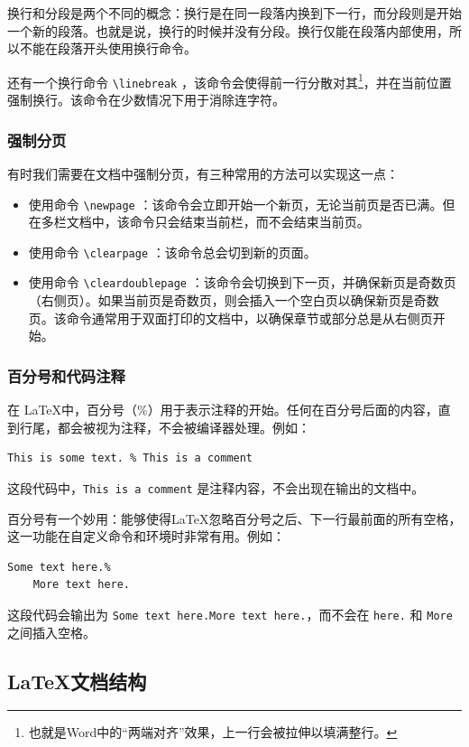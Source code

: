 换行和分段是两个不同的概念：换行是在同一段落内换到下一行，而分段则是开始一个新的段落。也就是说，换行的时候并没有分段。换行仅能在段落内部使用，所以不能在段落开头使用换行命令。

还有一个换行命令 \verb|\linebreak| ，该命令会使得前一行分散对其\footnote{也就是Word中的“两端对齐”效果，上一行会被拉伸以填满整行。}，并在当前位置强制换行。该命令在少数情况下用于消除连字符。

\subsubsection{强制分页}

有时我们需要在文档中强制分页，有三种常用的方法可以实现这一点：
\begin{itemize}
  \item 使用命令 \verb|\newpage| ：该命令会立即开始一个新页，无论当前页是否已满。但在多栏文档中，该命令只会结束当前栏，而不会结束当前页。
  \item 使用命令 \verb|\clearpage| ：该命令总会切到新的页面。
  \item 使用命令 \verb|\cleardoublepage| ：该命令会切换到下一页，并确保新页是奇数页（右侧页）。如果当前页是奇数页，则会插入一个空白页以确保新页是奇数页。该命令通常用于双面打印的文档中，以确保章节或部分总是从右侧页开始。
\end{itemize}

\subsubsection{百分号和代码注释}

在 \LaTeX 中，百分号（\%）用于表示注释的开始。任何在百分号后面的内容，直到行尾，都会被视为注释，不会被编译器处理。例如：
\begin{verbatim}
This is some text. % This is a comment
\end{verbatim}
这段代码中，\verb|This is a comment| 是注释内容，不会出现在输出的文档中。

百分号有一个妙用：能够使得LaTeX忽略百分号之后、下一行最前面的所有空格，这一功能在自定义命令和环境时非常有用。例如：
\begin{verbatim}
Some text here.%
    More text here.
\end{verbatim}
这段代码会输出为 \verb|Some text here.More text here.|，而不会在 \verb|here.| 和 \verb|More| 之间插入空格。

\subsection{\LaTeX 文档结构}

